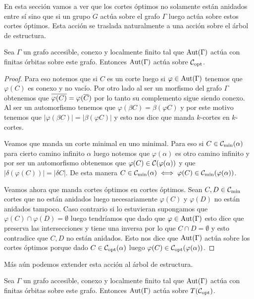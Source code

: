 \documentclass[tesis.tex]{subfiles}
\begin{document}
En esta sección vamos a ver que los cortes óptimos no solamente están anidados entre sí sino que si un grupo $G$ actúa sobre el grafo $\Gamma$ luego actúa sobre estos cortes óptimos.
Esta acción se traslada naturalmente a una acción sobre el árbol de estructura.



\begin{prop}
	Sea $\Gamma$ un grafo accesible, conexo y localmente finito tal que $\text{Aut}(\Gamma)$ actúa con finitas órbitas sobre este grafo.
	Entonces $\text{Aut}(\Gamma)$ actúa sobre ${\cal C}_{\text{opt}}$.
\end{prop}

\begin{proof}
	Para eso notemos que si $C$ es un corte luego si $\varphi \in \text{Aut}(\Gamma)$ tenemos que $\varphi(C)$ es conexo y no vacío. 
	Por otro lado al ser un morfismo del grafo $\Gamma$ obtenemos que $\overline{\varphi(C)} = \varphi(\overline C)$ por lo tanto su complemento sigue siendo conexo.
	Al ser un automorfismo tenemos que $\varphi(\beta C) = \beta (\varphi C)$ y por este motivo tenemos que $|\varphi (\beta C)| = |\beta (\varphi C)|$ y esto nos dice que manda $k$-cortes en $k$-cortes.
	
	
	Veamos que manda un corte minimal en uno minimal. 
	Para eso si $C \in {{\cal C}}_{\text{min}}(\alpha)$ para cierto camino infinito $\alpha$ luego notemos que $\varphi(\alpha)$ es otro camino infinito y por ser un automorfismo obtenemos que $\varphi(C) \in {\cal C}({\varphi(\alpha)})$ y que $|\delta(\varphi(C))| = |\delta C|$.
	De esta manera $C \in {\cal C}_{\text{min}}(\alpha) \iff \varphi(C) \in {\cal C}_{\text{min}}(\varphi(\alpha))$.
	
	
	Veamos ahora que manda cortes óptimos en cortes óptimos.
	Sean $C,D \in {\cal C}_{\text{min}}$ cortes que no están anidados luego necesariamente $\varphi(C)$ y $\varphi(D)$ no están anidados tampoco.
	Caso contrario si lo estuvieran supongamos que $\varphi(C) \cap \varphi(D) = \emptyset$ luego tendríamos que dado que $\varphi \in \text{Aut}(\Gamma)$ esto dice que preserva las intersecciones y tiene una inversa por lo que $C \cap D = \emptyset$ y esto contradice que $C, D$ no están anidados.
	Esto nos dice que $\text{Aut}(\Gamma)$ actúa sobre los cortes óptimos porque dado $C \in {\cal C}_{\text{opt}}(\alpha)$ luego $\varphi(C) \in {\cal C}_{\text{opt}}(\varphi(\alpha))$.
	
\end{proof}

Más aún podemos extender esta acción al árbol de estructura.

\begin{coro}
	Sea $\Gamma$ un grafo accesible, conexo y localmente finito tal que $\text{Aut}(\Gamma)$ actúa con finitas órbitas sobre este grafo.
	Entonces $\text{Aut}(\Gamma)$ actúa sobre $T({\cal C}_{\text{opt}})$.
\end{coro}
\end{document}
